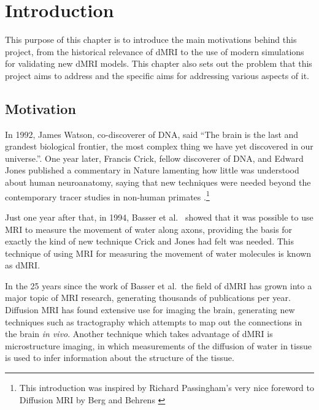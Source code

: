 \renewcommand{\LifeChapter}{y}
\chapter{Introduction}
\label{sec:introduction}

\chaptertoc{}

\begin{chapterabstract}
  This purpose of this chapter is to introduce the main motivations behind this project, from the historical relevance of \acl{dMRI} to the use of modern simulations for validating new \acl{dMRI} models.
  This chapter also sets out the problem that this project aims to address and the specific aims for addressing various aspects of it.
\end{chapterabstract}

\section{Motivation}
\label{sec:intro_motivation}
In 1992, James Watson, co-discoverer of DNA, said ``The brain is the last and grandest biological frontier, the most complex thing we have yet discovered in our universe.''\cite{NAP1785}.
One year later, Francis Crick, fellow discoverer of DNA, and Edward Jones published a commentary in Nature lamenting how little was understood about human neuroanatomy, saying that new techniques were needed beyond the contemporary tracer studies in non-human primates \cite{Crick1993}.\footnote{This introduction was inspired by Richard Passingham's very nice foreword to Diffusion MRI by Berg and Behrens \cite{Johansen-Berg2013}}

Just one year after that, in 1994, Basser et al.\ \cite{Basser1994} showed that it was possible to use \ac{MRI} to measure the movement of water along axons, providing the basis for exactly the kind of new technique Crick and Jones had felt was needed.
This technique of using \ac{MRI} for measuring the movement of water molecules is known as \ac{dMRI}.

In the 25 years since the work of Basser et al.\ the field of \acl{dMRI} has grown into a major topic of \ac{MRI} research, generating thousands of publications per year.
Diffusion MRI has found extensive use for imaging the brain, generating new techniques such as tractography which attempts to map out the connections in the brain \emph{in vivo}.
Another technique which takes advantage of \ac{dMRI} is microstructure imaging, in which measurements of the diffusion of water in tissue is used to infer information about the structure of the tissue. 


